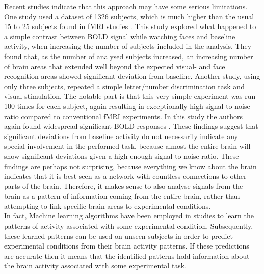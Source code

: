\documentclass[preprint,journal,11pt]{vgtc}
\begin{document}
\indent Recent studies indicate that this approach may have some serious limitations. One study used a dataset of 1326 subjects, which is much higher than the usual 15 to 25 subjects found in fMRI studies \cite{thy:2012very}. This study explored what happened to a simple contrast between BOLD signal while watching faces and baseline activity, when increasing the number of subjects included in the analysis. They found that, as the number of analysed subjects increased, an increasing number of brain areas that extended well beyond the expected visual- and face recognition areas showed significant deviation from baseline. Another study, using only three subjects, repeated a simple letter/number discrimination task and visual stimulation. The notable part is that this very simple experiment was run 100 times for each subject, again resulting in exceptionally high signal-to-noise ratio compared to conventional fMRI experiments. In this study the authors again found widespread significant BOLD-responses \cite{go:2012whole}. These findings suggest that significant deviations from baseline activity do not necessarily indicate any special involvement in the performed task, because almost the entire brain will show significant deviations given a high enough signal-to-noise ratio. These findings are perhaps not surprising, because everything we know about the brain indicates that it is best seen as a network with countless connections to other parts of the brain. Therefore, it makes sense to also analyse signals from the brain as a pattern of information coming from the entire brain, rather than attempting to link specific brain areas to experimental conditions.\\
\indent In fact, Machine learning algorithms have been employed in studies to learn the patterns of activity associated with some experimental condition. Subsequently, these learned patterns can be used on unseen subjects in order to predict experimental conditions from their brain activity patterns. If these predictions are accurate then it means that the identified patterns hold information about the brain activity associated with some experimental task.\\
\end{document}

